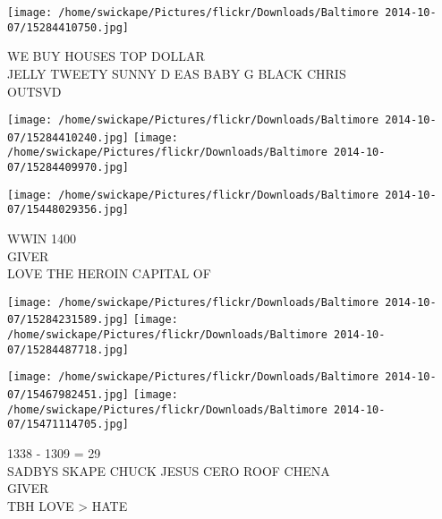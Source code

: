 \documentclass[10pt,letterpaper]{article}
\begin{document}
\vspace{0.25in}
\texttt{[image: /home/swickape/Pictures/flickr/Downloads/Baltimore 2014-10-07/15284410750.jpg]}

WE BUY HOUSES TOP DOLLAR\\
JELLY TWEETY SUNNY D EAS BABY G BLACK CHRIS\\
OUTSVD
\pagebreak

\texttt{[image: /home/swickape/Pictures/flickr/Downloads/Baltimore 2014-10-07/15284410240.jpg]}
\texttt{[image: /home/swickape/Pictures/flickr/Downloads/Baltimore 2014-10-07/15284409970.jpg]}

\vspace{0.25in}
\texttt{[image: /home/swickape/Pictures/flickr/Downloads/Baltimore 2014-10-07/15448029356.jpg]}

WWIN 1400\\
GIVER\\
LOVE THE HEROIN CAPITAL OF
\pagebreak

\texttt{[image: /home/swickape/Pictures/flickr/Downloads/Baltimore 2014-10-07/15284231589.jpg]}
\texttt{[image: /home/swickape/Pictures/flickr/Downloads/Baltimore 2014-10-07/15284487718.jpg]}

\texttt{[image: /home/swickape/Pictures/flickr/Downloads/Baltimore 2014-10-07/15467982451.jpg]}
\texttt{[image: /home/swickape/Pictures/flickr/Downloads/Baltimore 2014-10-07/15471114705.jpg]}

1338 {-} 1309 = 29\\
SADBYS SKAPE CHUCK JESUS CERO ROOF CHENA\\
GIVER\\
TBH LOVE > HATE
\pagebreak
\end{document}
